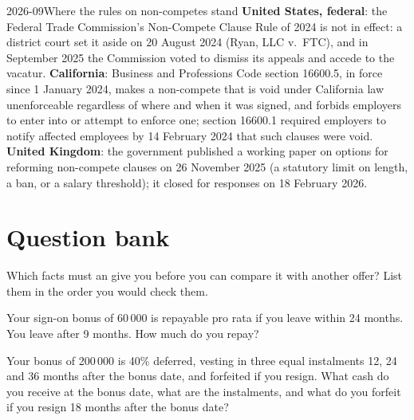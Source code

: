 \begin{dated}{2026-09}{Where the rules on non-competes stand}\label{dat:iv:offers-compensation-and-non-competes:noncompete}
\textbf{United States, federal}: the Federal Trade Commission's Non-Compete Clause Rule of 2024 is not in effect:
a district court set it aside on 20 August 2024 (Ryan, LLC v.\ FTC), and in September 2025 the Commission voted
to dismiss its appeals and accede to the vacatur. \textbf{California}: Business and Professions Code section
16600.5, in force since 1 January 2024, makes a non-compete that is void under California law unenforceable
regardless of where and when it was signed, and forbids employers to enter into or attempt to enforce one;
section 16600.1 required employers to notify affected employees by 14 February 2024 that such clauses were
void. \textbf{United Kingdom}: the government published a working paper on options for reforming non-compete
clauses on 26 November 2025 (a statutory limit on length, a ban, or a salary threshold); it closed for
responses on 18 February 2026.
\end{dated}

\section{Question bank}

\begin{interviewq}\label{iq:iv:offers-compensation-and-non-competes:1}
Which facts must an  give you before you can compare it with another offer? List them in the
order you would check them.
\end{interviewq}

\begin{interviewq}\label{iq:iv:offers-compensation-and-non-competes:2}
Your sign-on bonus of 60\,000 is repayable pro rata if you leave within 24 months. You leave after 9 months.
How much do you repay?
\end{interviewq}

\begin{interviewq}\label{iq:iv:offers-compensation-and-non-competes:3}
Your bonus of 200\,000 is 40\% deferred, vesting in three equal instalments 12, 24 and 36 months after the
bonus date, and forfeited if you resign. What cash do you receive at the bonus date, what are the instalments,
and what do you forfeit if you resign 18 months after the bonus date?
\end{interviewq}

